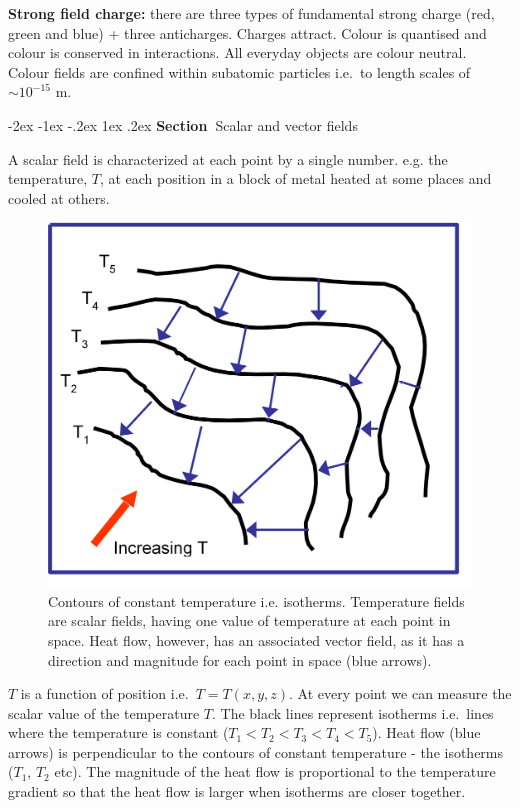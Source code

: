 \documentclass[
]{book}
\makeatletter
\renewcommand\section{%
\@startsection{section}{1}{\z@}%
              {-2ex \@plus -1ex \@minus -.2ex}%
              {1ex \@plus .2ex}%
              {\sffamily\bfseries\large\noindent Section~}}
\numberwithin{equation}{section}
\makeatother
\begin{document}
\textbf{Strong field charge:} there are three types of fundamental strong
charge (red, green and blue) + three anticharges. Charges attract.
Colour is quantised and colour is conserved in interactions. All
everyday objects are colour neutral. Colour fields are confined within
subatomic particles i.e.~to length scales of \(\sim 10^{-15}\) m.

\hypertarget{scalar-and-vector-fields}{%
\section{Scalar and vector fields}\label{scalar-and-vector-fields}}

A scalar field is characterized at each point by a single number. e.g.
the temperature, \(T\), at each position in a block of metal heated at
some places and cooled at others.

\begin{figure}

{\centering \includegraphics[width=0.7\linewidth]{Figures/isotherms} 

}

\caption{Contours of constant temperature i.e. isotherms. Temperature fields are scalar fields, having one value of temperature at each point in space. Heat flow, however, has an associated vector field, as it has a direction and magnitude for each point in space (blue arrows).}\label{fig:isotherms}
\end{figure}

\(T\) is a function of position i.e.~\(T = T(x,y,z)\). At every point we can
measure the scalar value of the temperature \(T\). The black lines
represent isotherms i.e.~lines where the temperature is constant
(\(T_1 < T_2 < T_3 < T_4 < T_5\)). Heat flow (blue arrows) is
perpendicular to the contours of constant temperature - the isotherms
(\(T_1\), \(T_2\) etc). The magnitude of the heat flow is proportional to
the temperature gradient so that the heat flow is larger when isotherms
are closer together.
\end{document}
